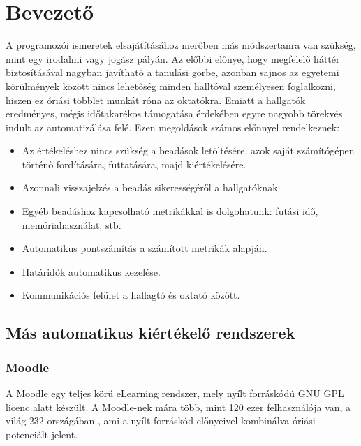 \chapter*{Bevezető}

A programozói ismeretek elsajátításához merőben más módszertanra van szükség, mint egy irodalmi vagy jogász pályán. Az előbbi előnye, hogy megfelelő háttér biztosításával nagyban javítható a tanulási görbe, azonban sajnos az egyetemi körülmények között nincs lehetőség minden halltóval személyesen foglalkozni, hiszen ez óriási többlet munkát róna az oktatókra. Emiatt a hallgatók eredményes, mégis időtakarékos támogatása érdekében egyre nagyobb törekvés indult az automatizálása felé. Ezen megoldások számos előnnyel rendelkeznek:

\begin{itemize}
    \item Az értékeléshez nincs szükség a beadások letöltésére, azok saját számítógépen történő fordítására, futtatására, majd kiértékelésére.
    \item Azonnali visszajelzés a beadás sikerességéről a hallgatóknak.
    \item Egyéb beadáshoz kapcsolható metrikákkal is dolgohatunk: futási idő, memóriahasználat, stb.
    \item Automatikus pontszámítás a számított metrikák alapján.
    \item Határidők automatikus kezelése.
    \item Kommunikációs felület a hallagtó és oktató között.
\end{itemize}

\section*{Más automatikus kiértékelő rendszerek}

\subsection*{Moodle}
A Moodle\cite{Moodle} egy teljes körű eLearning rendszer, mely nyílt forráskódú GNU GPL \cite{GNUGPL} licenc alatt készült. A Moodle-nek mára több, mint 120 ezer felhasználója van, a világ 232 országában \cite{MoodleStats}, ami a nyílt forráskód előnyeivel kombinálva óriási potenciált jelent. 

